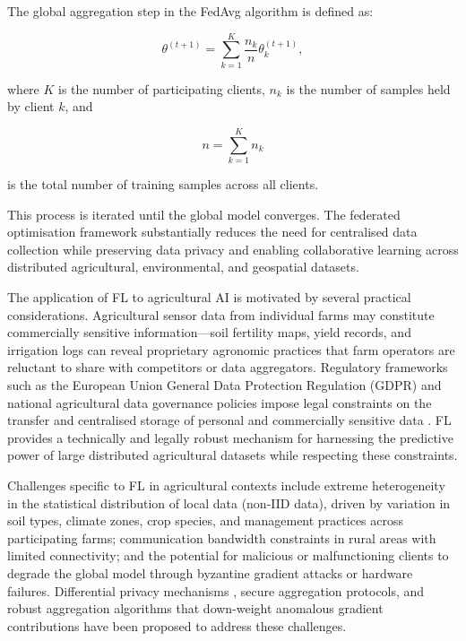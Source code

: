 \documentclass[land,article,submit,pdftex,moreauthors]{Definitions/mdpi}
\numberwithin{equation}{section}
\begin{document}
The global aggregation step in the FedAvg algorithm is defined as:

\begin{equation}
\theta^{(t+1)}
=
\sum_{k=1}^{K}
\frac{n_k}{n}
\theta_k^{(t+1)},
\end{equation}

where $K$ is the number of participating clients, $n_k$ is the number of samples held by client $k$, and

\begin{equation}
n=\sum_{k=1}^{K} n_k
\end{equation}

is the total number of training samples across all clients.

This process is iterated until the global model converges. The federated optimisation framework substantially reduces the need for centralised data collection while preserving data privacy and enabling collaborative learning across distributed agricultural, environmental, and geospatial datasets.

The application of FL to agricultural AI is motivated by several practical considerations. Agricultural sensor data from individual farms may constitute commercially sensitive information---soil fertility maps, yield records, and irrigation logs can reveal proprietary agronomic practices that farm operators are reluctant to share with competitors or data aggregators. Regulatory frameworks such as the European Union General Data Protection Regulation (GDPR) and national agricultural data governance policies impose legal constraints on the transfer and centralised storage of personal and commercially sensitive data \citep{regulation2016eu}. FL provides a technically and legally robust mechanism for harnessing the predictive power of large distributed agricultural datasets while respecting these constraints.

Challenges specific to FL in agricultural contexts include extreme heterogeneity in the statistical distribution of local data (non-IID data), driven by variation in soil types, climate zones, crop species, and management practices across participating farms; communication bandwidth constraints in rural areas with limited connectivity; and the potential for malicious or malfunctioning clients to degrade the global model through byzantine gradient attacks or hardware failures. Differential privacy mechanisms \citep{dwork2014algorithmic}, secure aggregation protocols, and robust aggregation algorithms that down-weight anomalous gradient contributions have been proposed to address these challenges.
\end{document}
